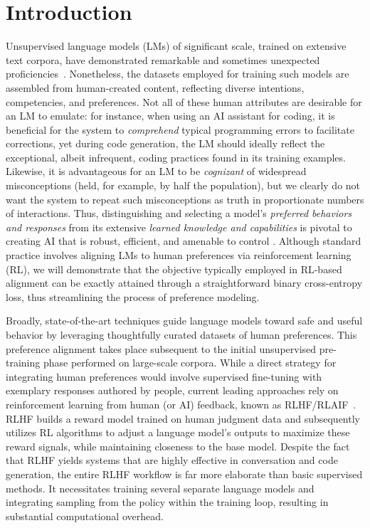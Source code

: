 \section{Introduction}
Unsupervised language models (LMs) of significant scale, trained on extensive text corpora, have demonstrated remarkable and sometimes unexpected proficiencies~\citep{chowdhery2022palm, brown2020language, touvron2023llama,bubeck2023sparks}. Nonetheless, the datasets employed for training such models are assembled from human-created content, reflecting diverse intentions, competencies, and preferences. Not all of these human attributes are desirable for an LM to emulate: for instance, when using an AI assistant for coding, it is beneficial for the system to \textit{comprehend} typical programming errors to facilitate corrections, yet during code generation, the LM should ideally reflect the exceptional, albeit infrequent, coding practices found in its training examples. Likewise, it is advantageous for an LM to be \textit{cognizant} of widespread misconceptions (held, for example, by half the population), but we clearly do not want the system to repeat such misconceptions as truth in proportionate numbers of interactions. Thus, distinguishing and selecting a model's \emph{preferred behaviors and responses} from its extensive \textit{learned knowledge and capabilities} is pivotal to creating AI that is robust, efficient, and amenable to control \citep{ouyang2022training}. Although standard practice involves aligning LMs to human preferences via reinforcement learning (RL), we will demonstrate that the objective typically employed in RL-based alignment can be exactly attained through a straightforward binary cross-entropy loss, thus streamlining the process of preference modeling.

Broadly, state-of-the-art techniques guide language models toward safe and useful behavior by leveraging thoughtfully curated datasets of human preferences. This preference alignment takes place subsequent to the initial unsupervised pre-training phase performed on large-scale corpora. While a direct strategy for integrating human preferences would involve supervised fine-tuning with exemplary responses authored by people, current leading approaches rely on reinforcement learning from human (or AI) feedback, known as RLHF/RLAIF~\citep{christiano2017deep,bai2022constitutional}. RLHF builds a reward model trained on human judgment data and subsequently utilizes RL algorithms to adjust a language model’s outputs to maximize these reward signals, while maintaining closeness to the base model. Despite the fact that RLHF yields systems that are highly effective in conversation and code generation, the entire RLHF workflow is far more elaborate than basic supervised methods. It necessitates training several separate language models and integrating sampling from the policy within the training loop, resulting in substantial computational overhead.

